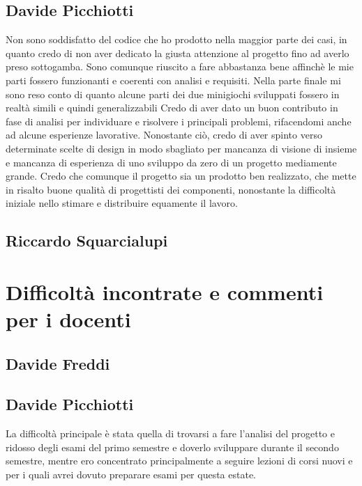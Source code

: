 \documentclass[a4paper,12pt]{report}
\begin{document}
    \subsection{Davide Picchiotti}
    Non sono soddisfatto del codice che ho prodotto nella maggior parte dei casi, in quanto credo di non aver dedicato la giusta attenzione
    al progetto fino ad averlo preso sottogamba.
    Sono comunque riuscito a fare abbastanza bene affinchè le mie parti fossero funzionanti e coerenti con analisi e requisiti.\newline
    Nella parte finale mi sono reso conto di quanto alcune parti dei due minigiochi sviluppati fossero in realtà simili e quindi generalizzabili\newline
    Credo di aver dato un buon contributo in fase di analisi per individuare e risolvere i principali problemi, rifacendomi anche ad alcune esperienze lavorative.
    Nonostante ciò, credo di aver spinto verso determinate scelte di design in modo sbagliato per mancanza di visione di insieme e mancanza
    di esperienza di uno sviluppo da zero di un progetto mediamente grande.\newline
    Credo che comunque il progetto sia un prodotto ben realizzato, che mette in risalto buone qualità di progettisti dei componenti,
    nonostante la difficoltà iniziale nello stimare e distribuire equamente il lavoro.

    \subsection{Riccardo Squarcialupi}

    \section{Difficoltà incontrate e commenti per i docenti}

	\subsection{Davide Freddi}
	\subsection{Davide Picchiotti}
    La difficoltà principale è stata quella di trovarsi a fare l'analisi del progetto e ridosso degli esami del primo semestre e doverlo sviluppare
    durante il secondo semestre, mentre ero concentrato principalmente a seguire lezioni di corsi nuovi e per i quali avrei dovuto preparare esami per questa estate.
\end{document}
